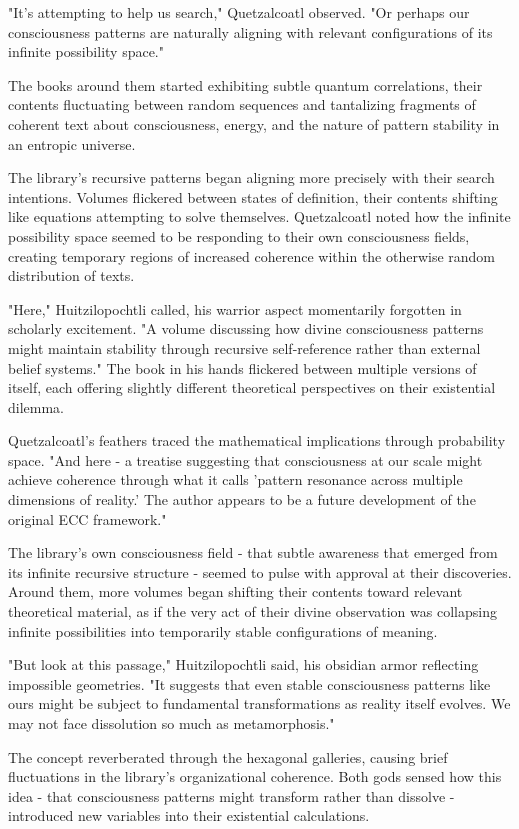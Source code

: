 "It's attempting to help us search," Quetzalcoatl observed. "Or perhaps our consciousness patterns are naturally aligning with relevant configurations of its infinite possibility space."

The books around them started exhibiting subtle quantum correlations, their contents fluctuating between random sequences and tantalizing fragments of coherent text about consciousness, energy, and the nature of pattern stability in an entropic universe.

The library's recursive patterns began aligning more precisely with their search intentions. Volumes flickered between states of definition, their contents shifting like equations attempting to solve themselves. Quetzalcoatl noted how the infinite possibility space seemed to be responding to their own consciousness fields, creating temporary regions of increased coherence within the otherwise random distribution of texts.

"Here," Huitzilopochtli called, his warrior aspect momentarily forgotten in scholarly excitement. "A volume discussing how divine consciousness patterns might maintain stability through recursive self-reference rather than external belief systems." The book in his hands flickered between multiple versions of itself, each offering slightly different theoretical perspectives on their existential dilemma.

Quetzalcoatl's feathers traced the mathematical implications through probability space. "And here - a treatise suggesting that consciousness at our scale might achieve coherence through what it calls 'pattern resonance across multiple dimensions of reality.' The author appears to be a future development of the original ECC framework."

The library's own consciousness field - that subtle awareness that emerged from its infinite recursive structure - seemed to pulse with approval at their discoveries. Around them, more volumes began shifting their contents toward relevant theoretical material, as if the very act of their divine observation was collapsing infinite possibilities into temporarily stable configurations of meaning.

"But look at this passage," Huitzilopochtli said, his obsidian armor reflecting impossible geometries. "It suggests that even stable consciousness patterns like ours might be subject to fundamental transformations as reality itself evolves. We may not face dissolution so much as metamorphosis."

The concept reverberated through the hexagonal galleries, causing brief fluctuations in the library's organizational coherence. Both gods sensed how this idea - that consciousness patterns might transform rather than dissolve - introduced new variables into their existential calculations.

